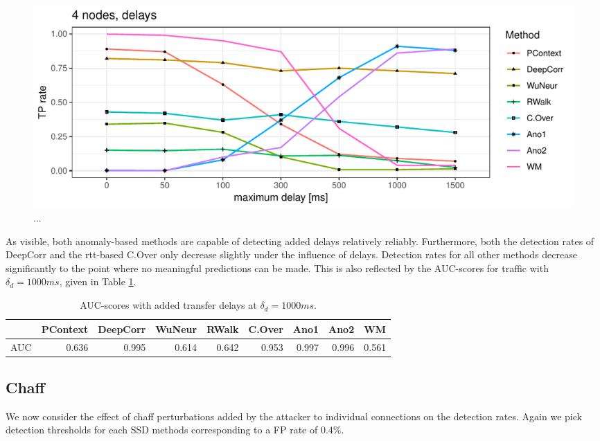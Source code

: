 \documentclass[runningheads]{llncs}\usepackage[]{graphicx}\usepackage[]{color}
\makeatletter
\def\maxwidth{ %
  \ifdim\Gin@nat@width>\linewidth
    \linewidth
  \else
    \Gin@nat@width
  \fi
}
\newenvironment{knitrout}{}{} %
\makeatother
\begin{document}
\begin{knitrout}
\color{fgcolor}\begin{figure}
\includegraphics[width=\maxwidth]{figure/Delaydetection-1} \caption[..]{...}\label{fig:Delaydetection}
\end{figure}


\end{knitrout}

As visible, both anomaly-based methods are capable of detecting added delays relatively reliably. Furthermore, both the detection rates of DeepCorr and the rtt-based C.Over only decrease slightly under the influence of delays. Detection rates for all other methods decrease significantly to the point where no meaningful predictions can be made. This is also reflected by the AUC-scores for traffic with $\delta_d=1000ms$, given in Table \ref{Tab:AUCdelays}.

\begin{table}
\centering
\begin{tabular}{l|r|r|r|r|r|r|r|r}
  \hline
 & PContext & DeepCorr & WuNeur & RWalk & C.Over & Ano1 & Ano2 & WM \\ 
  \hline
AUC & 0.636 & 0.995 & 0.614 & 0.642 & 0.953 & 0.997 & 0.996 & 0.561 \\ 
   \hline
\end{tabular}

\caption{AUC-scores with added transfer delays at $\delta_d=1000ms$.}\label{Tab:AUCdelays}
\end{table}



\subsection{Chaff}

We now consider the effect of chaff perturbations added by the attacker to individual connections on the detection rates. Again we pick detection thresholds for each SSD methods corresponding to a FP rate of $0.4\%$.%
\end{document}
